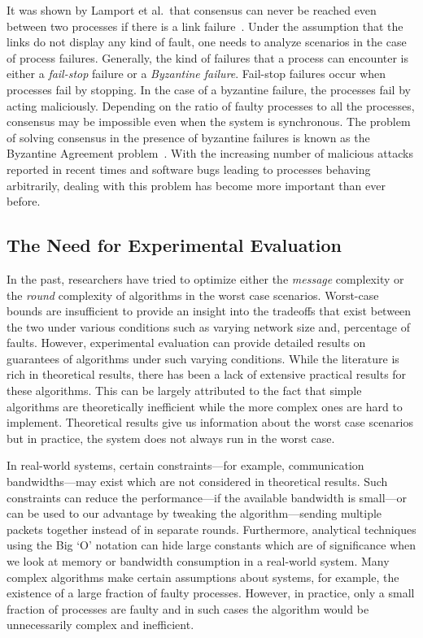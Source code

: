 It was shown by Lamport et al.\ that consensus can never be reached even
between two processes if there is a link failure~\cite{LamportSP82}. Under the
assumption that the links do not display any kind of fault, one needs to
analyze scenarios in the case of process failures. Generally, the kind of
failures that a process can encounter is either a \textit{fail-stop} failure or
a \textit{Byzantine failure}. Fail-stop failures occur when processes fail by
stopping. In the case of a byzantine failure, the processes fail by acting
maliciously. Depending on the ratio of faulty processes to all the processes,
consensus may be impossible even when the system is synchronous. The problem of
solving consensus in the presence of byzantine failures is known as the
Byzantine Agreement problem~\cite{LamportSP82}. With the increasing number of
malicious attacks reported in recent times and software bugs leading to
processes behaving arbitrarily, dealing with this problem has become more
important than ever before.

\subsection{The Need for Experimental Evaluation}

In the past, researchers have tried to optimize either the \textit{message}
complexity or the \textit{round} complexity of algorithms in the worst case
scenarios. Worst-case bounds are insufficient to provide an insight into the
tradeoffs that exist between the two under various conditions such as varying 
network size and, percentage of faults. However, experimental evaluation 
can provide detailed results on guarantees of algorithms under
such varying conditions.  While the literature is rich in theoretical results,
there has been a lack of extensive practical results for these algorithms. This
can be largely attributed to the fact that simple algorithms are theoretically
inefficient while the more complex ones are hard to implement. Theoretical
results give us information about the worst case scenarios but in
practice, the system does not always run in the worst case. 

In real-world systems, certain constraints---for example, communication
ban\-d\-widths---may exist which are not considered in theoretical results. Such
constraints can reduce the performance---if the available bandwidth is
small---or can be used to our advantage by tweaking the algorithm---sending
multiple packets together instead of in separate rounds. Furthermore, analytical 
techniques using the Big `O' notation can hide large constants which are
of significance when we look at memory or bandwidth consumption in a real-world
system. Many complex algorithms make certain assumptions about systems, for
example, the existence of a large fraction of faulty processes. However, in practice, 
only a small fraction of processes are faulty and in such cases the
algorithm would be unnecessarily complex and inefficient.



